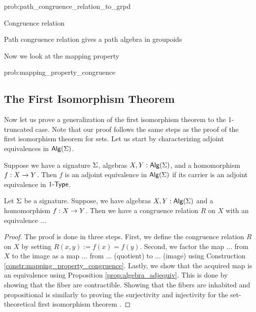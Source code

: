 \begin{construction}{prob:path_congruence_relation_to_grpd}

\end{construction}

\begin{definition}
Congruence relation
\end{definition}

\begin{problem}
\label{prob:congruence_relation_to_grpd}
Path congruence relation gives a path algebra in groupoids
\end{problem}

Now we look at the mapping property

\begin{problem}
\label{prob:mapping_property_congruence}

\end{problem}

\begin{construction}{prob:mapping_property_congruence}
\label{constr:mapping_property_congruence}

\end{construction}

\subsection{The First Isomorphism Theorem}
Now let us prove a generalization of the first isomorphism theorem to the 1-truncated case.
Note that our proof follows the same steps as the proof of the first isomorphism theorem for sets.
Let us start by characterizing adjoint equivalences in $\mathsf{Alg}(\Sigma)$.

\begin{proposition}
\label{prop:algebra_adjequiv}
Suppose we have a signature $\Sigma$, algebras $X, Y : \mathsf{Alg}(\Sigma)$, and a homomorphism $f : X \rightarrow Y$.
Then $f$ is an adjoint equivalence in $\mathsf{Alg}(\Sigma)$ if its carrier is an adjoint equivalence in $1\mbox{-}\mathsf{Type}$.
\end{proposition}

\begin{theorem}
Let $\Sigma$ be a signature.
Suppose, we have algebras $X, Y : \mathsf{Alg}(\Sigma)$ and a homomorphism $f : X \rightarrow Y$.
Then we have a congruence relation $R$ on $X$ with an equivalence ... 
\end{theorem}

\begin{proof}
The proof is done in three steps.
First, we define the congruence relation $R$ on $X$ by setting $R(x, y) := f(x) = f(y)$.
Second, we factor the map ... from $X$ to the image as a map ... from ... (quotient) to ... (image) using Construction \ref{constr:mapping_property_congruence}.
Lastly, we show that the acquired map is an equivalence using Proposition \ref{prop:algebra_adjequiv}.
This is done by showing that the fiber are contractible.
Showing that the fibers are inhabited and propositional is similarly to proving the surjectivity and injectivity for the set-theoretical first isomorphism theorem \cite{lynge2019}.
\end{proof}

